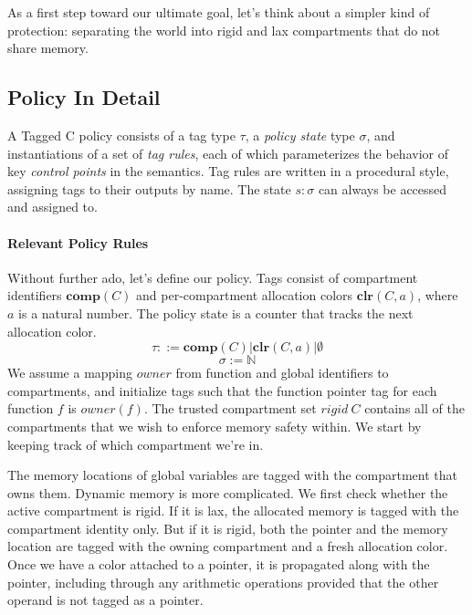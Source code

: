 \documentclass{article}
\begin{document}
As a first step toward our ultimate goal, let's think about a simpler kind of protection:
separating the world into rigid and lax compartments that do not share memory.

\subsection{Policy In Detail}

A Tagged C policy consists of a tag type \(\tau\), a {\it policy state} type \(\sigma\),
and instantiations of a set of {\it tag rules}, each of which parameterizes the behavior
of key {\it control points} in the semantics. Tag rules are written in a procedural style,
assigning tags to their outputs by name. The state \(s : \sigma\) can always be accessed
and assigned to.

\paragraph{Relevant Policy Rules}

Without further ado, let's define our policy. Tags consist of compartment identifiers
\(\mathbf{comp}(C)\) and per-compartment allocation colors \(\mathbf{clr}(C,a)\), where
\(a\) is a natural number. The policy state is a counter that tracks the next allocation color.
\[\tau ::= \mathbf{comp}(C) | \mathbf{clr}(C,a) | \emptyset \]
\[\sigma := \mathbb{N} \]
We assume a mapping \(owner\) from function and global identifiers to compartments,
and initialize tags such that the function pointer tag for each function \(f\) is \(owner(f)\).
The trusted compartment set \(\mathit{rigid} ~ C\) contains all of the compartments that
we wish to enforce memory safety within. We start by keeping track of which compartment we're in.

\begin{minipage}{0.49\textwidth}
\end{minipage}
\begin{minipage}{0.49\textwidth}
  \rettruleblock{\(\PCT['] := \PCT[_{CLR}]\)}
\end{minipage}

The memory locations of global variables are tagged with the compartment that owns them.
Dynamic memory is more complicated. We first check whether the active compartment is rigid.
If it is lax, the allocated memory is tagged with the compartment identity only. But if it is
rigid, both the pointer and the memory location are tagged with the owning compartment and
a fresh allocation color. Once we have a color attached to a pointer, it is propagated along
with the pointer, including through any arithmetic operations provided that the other operand
is not tagged as a pointer.
\end{document}
